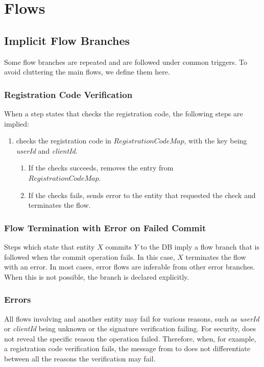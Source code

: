 \documentclass[a4paper,10pt,draft]{article}
\newcommand{\userId}{\emph{userId}}
\newcommand{\clientId}{\emph{clientId}}
\begin{document}
\section{Flows}

\subsection{Implicit Flow Branches}
Some flow branches are repeated and are followed under common triggers. To avoid cluttering the main flows, we define them here.

\subsubsection{Registration Code Verification}
When a step states that \Server{} checks the registration code, the following steps are implied:

\begin{enumerate}
 \item \Server{} checks the registration code in $RegistrationCodeMap$, with the key being \userId{} and \clientId{}.
 \begin{enumerate}
  \item If the checks succeeds, \Server{} removes the entry from\\$RegistrationCodeMap$.
  \item If the checks fails, \Server{} sends error to the entity that requested the check and terminates the flow.
 \end{enumerate}
\end{enumerate}

\subsubsection{Flow Termination with Error on Failed Commit}
Steps which state that entity $X$ commits $Y$ to the DB imply a flow branch that is followed when the commit operation fails. In this case, $X$ terminates the flow with an error. 
In most cases, error flows are inferable from other error branches. When this is not possible, the branch is declared explicitly. 

\subsubsection{\Server{} Errors}
All flows involving \Server{} and another entity may fail for various reasons, such as \userId{} or \clientId{} being unknown or the signature verification failing. For security, 
\Server{} does not reveal the specific reason the operation failed. Therefore, when, for example, a registration code verification fails, the message from \Server{} to \Client{} 
does not differentiate between all the reasons the verification may fail.
\end{document}
